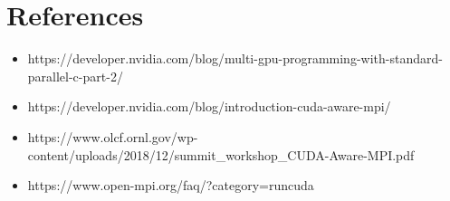 \documentclass{article}
\begin{document}
\section*{References}
\begin{itemize}
    \item https://developer.nvidia.com/blog/multi-gpu-programming-with-standard-parallel-c-part-2/
    \item https://developer.nvidia.com/blog/introduction-cuda-aware-mpi/
    \item https://www.olcf.ornl.gov/wp-
    content/uploads/2018/12/summit\_workshop\_CUDA-Aware-MPI.pdf
    \item https://www.open-mpi.org/faq/?category=runcuda
\end{itemize}
\end{document}
